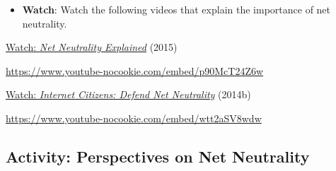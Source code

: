\documentclass[
  letterpaper,
  DIV=11,
  numbers=noendperiod]{scrreprt}
\providecommand{\tightlist}{%
  \setlength{\itemsep}{0pt}\setlength{\parskip}{0pt}}\usepackage{longtable,booktabs,array}
\begin{document}
\begin{tcolorbox}[enhanced jigsaw, toprule=.15mm, colback=white, colframe=quarto-callout-note-color-frame, bottomtitle=1mm, leftrule=.75mm, coltitle=black, titlerule=0mm, rightrule=.15mm, colbacktitle=quarto-callout-note-color!10!white, left=2mm, title={Learning Activity}, opacitybacktitle=0.6, opacityback=0, breakable, toptitle=1mm, arc=.35mm, bottomrule=.15mm]

\begin{itemize}
\tightlist
\item
  \textbf{Watch}: Watch the following videos that explain the importance
  of net neutrality.
\end{itemize}

\href{https://www.youtube.com/watch?v=p90McT24Z6w}{Watch: \emph{Net
Neutrality Explained}} (2015)

\url{https://www.youtube-nocookie.com/embed/p90McT24Z6w}

\href{https://www.youtube.com/watch?v=wtt2aSV8wdw}{Watch: \emph{Internet
Citizens: Defend Net Neutrality}} (2014b)

\url{https://www.youtube-nocookie.com/embed/wtt2aSV8wdw}

\end{tcolorbox}

\subsection{Activity: Perspectives on Net
Neutrality}\label{activity-perspectives-on-net-neutrality}
\end{document}
